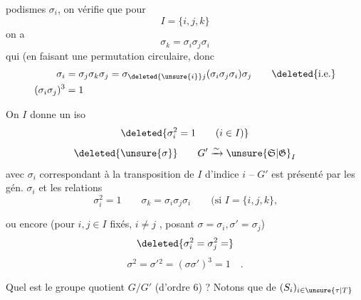 %
podismes $\sigma_i$, on vérifie que pour
\[
I=\{i,j,k\}
\]
on a
\[
\sigma_k=\sigma_i\sigma_j\sigma_i
\]
 qui   (en faisant une permutation circulaire, donc
\[
\begin{aligned}
\sigma_i&=\sigma_j\sigma_k\sigma_j
=\sigma_{\deleted{\unsure{i}}j}(\sigma_i\sigma_j\sigma_i)\sigma_j
\qquad\deleted{\text{i.e.}}\\
(\sigma_i\sigma_j)^3&=1
\end{aligned}
\]

On   $I$ donne un iso 
\[
\deleted{\sigma_i^2=1\qquad(i\in I)}
\]
\[
\deleted{\unsure{\sigma}}\qquad G'\xrightarrow{\sim}\unsure{\mathfrak S|\mathfrak G}_I
\]
avec $\sigma_i$ correspondant à la transposition de $I$ d'indice $i$ -- $G'$ est présenté par les gén. $\sigma_i$  et les  relations
\[
\sigma_i^2=1\qquad \sigma_k=\sigma_i\sigma_j\sigma_i\qquad
\text{(si $I=\{i,j,k\}$,}
\]

ou encore (pour $i,j\in I$ fixés, $i\ne j$ , posant  $\sigma=\sigma_i,\sigma'=\sigma_j$)
\[
\deleted{\sigma_i^2=\sigma_j^2=}
\]
\[
\sigma^2=\sigma'{}^2=(\sigma\sigma')^3=1\quad.
\]

Quel est le groupe quotient $G/G'$ (d'ordre $6$) ? Notons que    de $(S_i)_{i\in\unsure{\tau|T}}$

